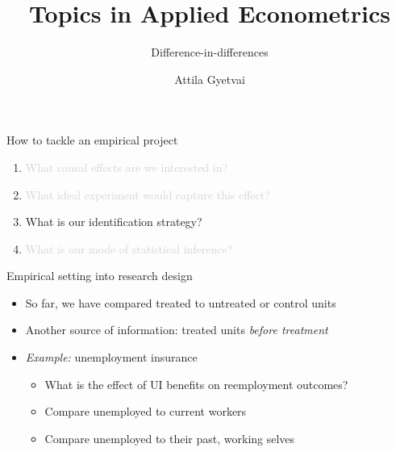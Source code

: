 \documentclass[aspectratio=169,compress,handout,t,xcolor=table]{beamer}
\title{Topics in Applied Econometrics}
\subtitle[]{Difference-in-differences}
\author[Attila Gyetvai]{Attila Gyetvai}
\institute[]{Duke Economics \\ Summer 2020}
\date{}
\begin{document}
{
\begin{frame}
  \titlepage
\end{frame}
}
\addtocounter{framenumber}{-1}

\begin{frame}[c]{How to tackle an empirical project}
  \begin{enumerate}
    \addtolength{\itemsep}{0.5\baselineskip}
    \item \textcolor{lightgray}{What causal effects are we interested in?}
    \item \textcolor{lightgray}{What ideal experiment would capture this effect?}
    \item What is our identification strategy?
    \item \textcolor{lightgray}{What is our mode of statistical inference?}
  \end{enumerate}
\end{frame}

\begin{frame}{Empirical setting into research design}
  \begin{itemize}
    \item So far, we have compared treated to untreated or control units
    \item Another source of information: treated units \emph{before treatment}
    \item \emph{Example:} unemployment insurance
    \begin{itemize}
      \item What is the effect of UI benefits on reemployment outcomes?
      \item Compare unemployed to current workers
      \item Compare unemployed to their past, working selves
    \end{itemize}
  \end{itemize}
\end{frame}
\end{document}
